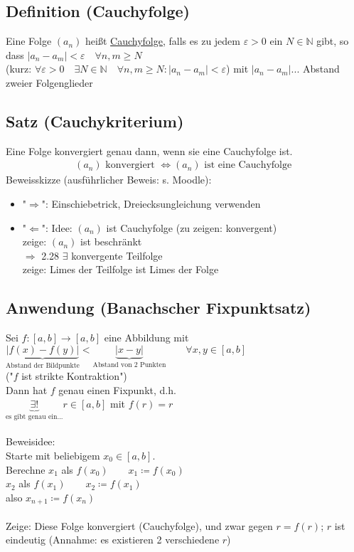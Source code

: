 \documentclass[12pt, titlepage]{article}
\newcommand{\N}{\mathds{N}}
\renewcommand{\>}{\rightarrow}
\renewcommand{\*}{\cdot}
\renewcommand{\epsilon}{\varepsilon}
\begin{document}
	\subsection{Definition (Cauchyfolge)}
	Eine Folge $(a_n)$ heißt \underline{Cauchyfolge}, falls es zu jedem $\epsilon>0$ ein $N\in\N$ gibt, so dass $|a_n-a_m|<\epsilon\quad\forall n,m\geq N$\\
	(kurz: $\forall\epsilon>0\quad\exists N\in\N\quad\forall n,m\geq N\colon|a_n-a_m|<\epsilon$) mit $|a_n-a_m|$... Abstand zweier Folgenglieder
	\subsection{Satz (Cauchykriterium)}
	Eine Folge konvergiert genau dann, wenn sie eine Cauchyfolge ist.
	\begin{align*}
		(a_n)\textrm{ konvergiert }\Leftrightarrow(a_n)\textrm{ ist eine Cauchyfolge }
	\end{align*}
	Beweisskizze (ausführlicher Beweis: s. Moodle):
	\begin{itemize}
		\item "$\Rightarrow$": Einschiebetrick, Dreiecksungleichung verwenden
		\item "$\Leftarrow$": Idee: $(a_n)$ ist Cauchyfolge (zu zeigen: konvergent)\\
		zeige: $(a_n)$ ist beschränkt\\
		$\Rightarrow$ 2.28 $\exists$ konvergente Teilfolge\\
		zeige: Limes der Teilfolge ist Limes der Folge
	\end{itemize}
	\subsection{Anwendung (Banachscher Fixpunktsatz)}
	Sei $f\colon[a,b]\>[a,b]$ eine Abbildung mit\\
	$\underbrace{|f(x)-f(y)|}_{\textrm{Abstand der Bildpunkte}}<\underbrace{|x-y|}_{\textrm{Abstand von 2 Punkten}}\qquad\forall x,y\in[a,b]$\\
	("$f$ ist strikte Kontraktion")\\
	Dann hat $f$ genau einen Fixpunkt, d.h.\\
	$\underbrace{\exists!}_{\textrm{es gibt genau ein...}}r\in[a,b]$ mit $f(r)=r$\\
	\\
	Beweisidee:\\
	Starte mit beliebigem $x_0\in[a,b]$.\\
	Berechne $x_1$ als $f(x_0)\qquad x_1\coloneqq f(x_0)$\\
	$x_2$ als $f(x_1)\qquad x_2\coloneqq f(x_1)$\\
	also $x_{n+1}\coloneqq f(x_n)$\\
	\\
	Zeige: Diese Folge konvergiert (Cauchyfolge), und zwar gegen $r=f(r)$; $r$ ist eindeutig (Annahme: es existieren 2 verschiedene $r$)
	\newpage
\end{document}
